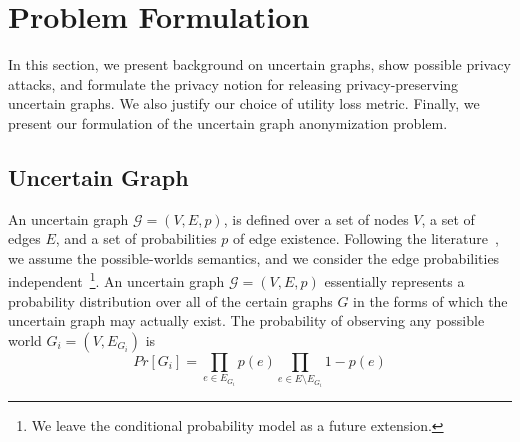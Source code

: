 \section{Problem Formulation}
\label{sec:notation}

In this section, we present background on uncertain graphs, show possible privacy attacks, and formulate the privacy notion for releasing privacy-preserving uncertain graphs. We also justify our choice of utility loss metric. Finally, we present our formulation of the uncertain graph anonymization problem. 

\subsection{Uncertain Graph}
An uncertain graph $\mathcal{G}=(V,E,\mathit{p})$, is defined over a set of nodes $V$, a set of edges $E$, and a set of probabilities $\mathit{p}$ of edge existence. Following the literature~\cite{Potamias_K_2010,Zhao_Detecting_2014,Colbourn_Colbourn_1987}, we assume the possible-worlds semantics, and we consider the edge probabilities independent~\footnote{We leave the conditional probability model as a future
extension.}. An uncertain graph $\mathcal{G}=(V,E,\mathit{p})$ essentially represents a probability distribution over all of the certain graphs $G$ in the forms of which the uncertain graph may actually exist. 
The probability of observing any possible world $G_i=(V,E_{G_i})$ is    
\begin{equation*}
    Pr[G_i]=\prod_{e \in E_{G_i}} {\mathit{p}(e)} \prod_{e \in E \setminus E_{G_i}} 1-\mathit{p}(e)
\end{equation*}
